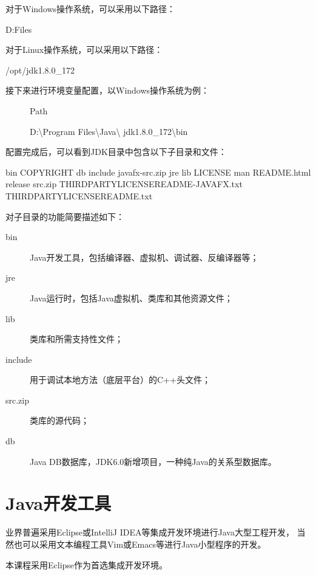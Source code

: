 对于Windows操作系统，可以采用以下路径：

\begin{shCode}
  D:\Program Files\Java
\end{shCode}

对于Linux操作系统，可以采用以下路径：

\begin{shCode}
  /opt/jdk1.8.0_172
\end{shCode}

接下来进行环境变量配置，以Windows操作系统为例：

\begin{description}
\item[] Path
\item[] D:\textbackslash Program Files\textbackslash Java\textbackslash
  jdk1.8.0\_172\textbackslash bin
\end{description}

配置完成后，可以看到JDK目录中包含以下子目录和文件：

\begin{shCode}
  bin  COPYRIGHT  db  include  javafx-src.zip
  jre  lib  LICENSE  man  README.html  release  src.zip
  THIRDPARTYLICENSEREADME-JAVAFX.txt  THIRDPARTYLICENSEREADME.txt  
\end{shCode}

对子目录的功能简要描述如下：

\begin{description}
\item[bin] Java开发工具，包括编译器、虚拟机、调试器、反编译器等；
\item[jre] Java运行时，包括Java虚拟机、类库和其他资源文件；
\item[lib] 类库和所需支持性文件；
\item[include] 用于调试本地方法（底层平台）的C++头文件；
\item[src.zip] 类库的源代码；
\item[db] Java DB数据库，JDK6.0新增项目，一种纯Java的关系型数据库。
\end{description}

\section{Java开发工具}

业界普遍采用Eclipse或IntelliJ IDEA等集成开发环境进行Java大型工程开发，
当然也可以采用文本编程工具Vim或Emacs等进行Java小型程序的开发。

本课程采用Eclipse作为首选集成开发环境。


